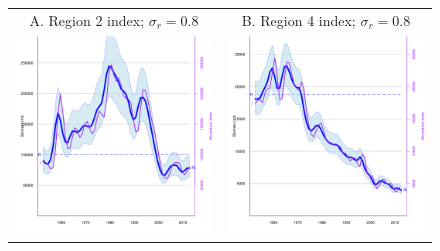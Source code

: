 \documentclass[12pt,letterpaper]{article}
\begin{document}
\begin{figure}
\begin{center}
{\scriptsize \sffamily
\begin{tabular}{cc}
A. Region 2 index; $\sigma_r=0.8$ &
B. Region 4 index; $\sigma_r=0.8$ \\
\includegraphics[height=0.35\textheight]{./4-gear-runs_r2_est_popB1.pdf} &
\includegraphics[height=0.35\textheight]{./4-gear-runs_r4_est_popB1.pdf} \\

\end{tabular}}
\end{center}
\end{figure}
\end{document}
